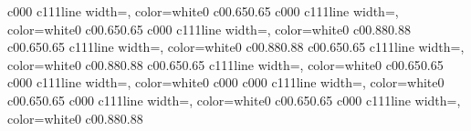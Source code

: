 \documentclass{standalone}
\begin{document}
\begin{knitdiagram}
{c}{0}{0}{0}
{c}{1}{1}{1}{line width=\outlineThickness*\dx, color=white}{0}
{c}{0}{0.65}{0.65}
{c}{0}{0}{0}
{c}{1}{1}{1}{line width=\outlineThickness*\dx, color=white}{0}
{c}{0}{0.65}{0.65}
{c}{0}{0}{0}
{c}{1}{1}{1}{line width=\outlineThickness*\dx, color=white}{0}
{c}{0}{0.88}{0.88}
{c}{0}{0.65}{0.65}
{c}{1}{1}{1}{line width=\outlineThickness*\dx, color=white}{0}
{c}{0}{0.88}{0.88}
{c}{0}{0.65}{0.65}
{c}{1}{1}{1}{line width=\outlineThickness*\dx, color=white}{0}
{c}{0}{0.88}{0.88}
{c}{0}{0.65}{0.65}
{c}{1}{1}{1}{line width=\outlineThickness*\dx, color=white}{0}
{c}{0}{0.65}{0.65}
{c}{0}{0}{0}
{c}{1}{1}{1}{line width=\outlineThickness*\dx, color=white}{0}
{c}{0}{0}{0}
{c}{0}{0}{0}
{c}{1}{1}{1}{line width=\outlineThickness*\dx, color=white}{0}
{c}{0}{0.65}{0.65}
{c}{0}{0}{0}
{c}{1}{1}{1}{line width=\outlineThickness*\dx, color=white}{0}
{c}{0}{0.65}{0.65}
{c}{0}{0}{0}
{c}{1}{1}{1}{line width=\outlineThickness*\dx, color=white}{0}
{c}{0}{0.88}{0.88}
\end{knitdiagram}
\end{document}
